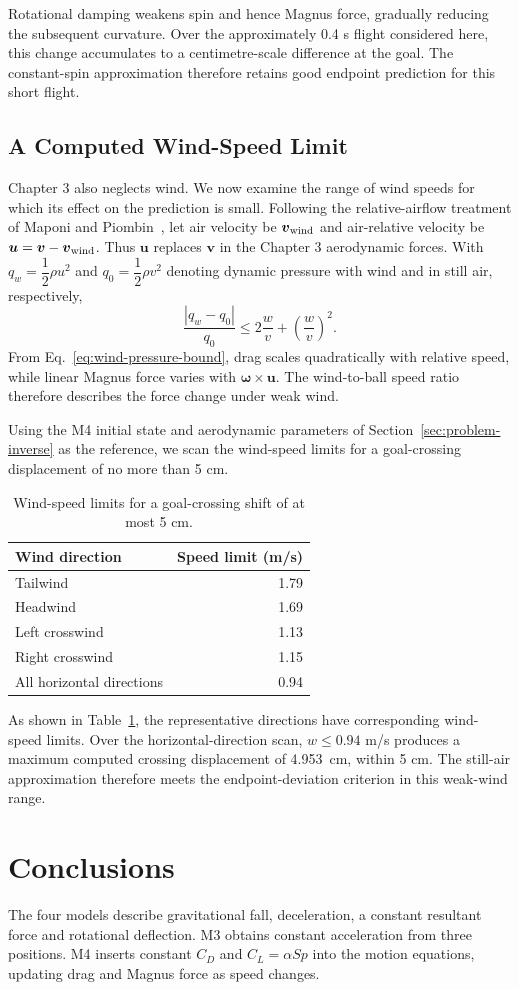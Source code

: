 \documentclass[12pt,letterpaper]{article}
\newcommand{\ChSixWindBound}{0.94}
\newcommand{\ChSixWindMaxShift}{4.953}
\newcommand{\ChSixWindTable}{\begin{table}[H]\centering\small
\caption{Wind-speed limits for a goal-crossing shift of at most 5 cm.}\label{tab:wind}
\setlength{\tabcolsep}{5pt}\begin{tabular}{lr}\toprule
Wind direction & Speed limit (m/s)\\\midrule
Tailwind & 1.79\\
Headwind & 1.69\\
Left crosswind & 1.13\\
Right crosswind & 1.15\\
All horizontal directions & 0.94\\
\bottomrule\end{tabular}\end{table}}
\begin{document}
Rotational damping weakens spin and hence Magnus force, gradually reducing the subsequent curvature. Over the approximately 0.4 s flight considered here, this change accumulates to a centimetre-scale difference at the goal. The constant-spin approximation therefore retains good endpoint prediction for this short flight.

\subsection{A Computed Wind-Speed Limit}\label{sec:wind}
Chapter 3 also neglects wind. We now examine the range of wind speeds for which its effect on the prediction is small. Following the relative-airflow treatment of Maponi and Piombin~\cite{maponi}, let air velocity be $\boldsymbol v_{\rm wind}$ and air-relative velocity be $\boldsymbol u=\boldsymbol v-\boldsymbol v_{\rm wind}$. Thus $\boldsymbol u$ replaces $\boldsymbol v$ in the Chapter 3 aerodynamic forces. With $q_w=\dfrac{1}{2}\rho u^2$ and $q_0=\dfrac{1}{2}\rho v^2$ denoting dynamic pressure with wind and in still air, respectively,
\begin{equation}
\dfrac{|q_w-q_0|}{q_0}\leq 2\dfrac{w}{v}+\left(\dfrac{w}{v}\right)^2.
\label{eq:wind-pressure-bound}\end{equation}
From Eq.~\eqref{eq:wind-pressure-bound}, drag scales quadratically with relative speed, while linear Magnus force varies with $\boldsymbol\omega\times\boldsymbol u$. The wind-to-ball speed ratio therefore describes the force change under weak wind.

Using the M4 initial state and aerodynamic parameters of Section~\ref{sec:problem-inverse} as the reference, we scan the wind-speed limits for a goal-crossing displacement of no more than 5 cm.
\ChSixWindTable
As shown in Table~\ref{tab:wind}, the representative directions have corresponding wind-speed limits. Over the horizontal-direction scan, $w\leq\ChSixWindBound$ m/s produces a maximum computed crossing displacement of \ChSixWindMaxShift\ cm, within 5 cm. The still-air approximation therefore meets the endpoint-deviation criterion in this weak-wind range.

\section{Conclusions}
The four models describe gravitational fall, deceleration, a constant resultant force and rotational deflection. M3 obtains constant acceleration from three positions. M4 inserts constant $C_D$ and $C_L=\alpha Sp$ into the motion equations, updating drag and Magnus force as speed changes.
\end{document}
